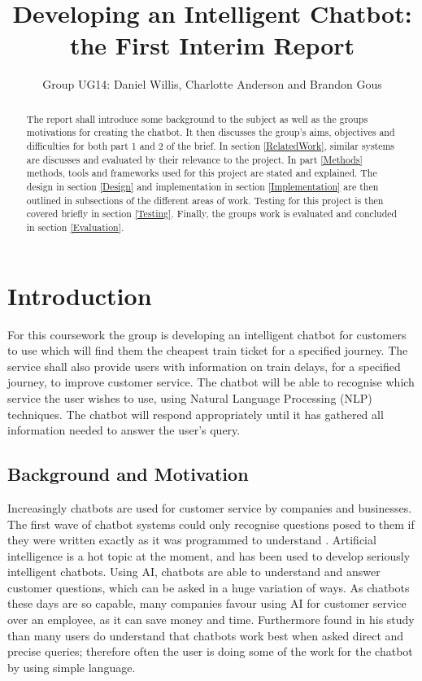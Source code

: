 \documentclass[11pt]{article}
\title{Developing an Intelligent Chatbot: the First Interim Report}
\author{Group UG14: Daniel Willis, Charlotte Anderson and Brandon Gous}
\begin{document}
	
	\maketitle	
	\begin{abstract}
		The report shall introduce some background to the subject as well as the groups motivations for creating the chatbot. It then discusses the group's aims, objectives and difficulties for both part 1 and 2 of the brief. In section \ref{RelatedWork}, similar systems are discusses and evaluated by their relevance to the project. In part \ref{Methods} methods, tools and frameworks used for this project are stated and explained. The design in section \ref{Design} and implementation in section \ref{Implementation} are then outlined in subsections of the different areas of work. Testing for this project is then covered briefly in section \ref{Testing}. Finally, the groups work is evaluated and concluded in section \ref{Evaluation}.
		
	\end{abstract}
	
	\section{Introduction}
	
	For this coursework \citep{AI2018CW} the group is developing an intelligent chatbot for customers to use which will find them the cheapest train ticket for a specified journey. The service shall also provide users with information on train delays, for a specified journey, to improve customer service. The chatbot will be able to recognise which service the user wishes to use, using Natural Language Processing (NLP) techniques. The chatbot will respond appropriately until it has gathered all information needed to answer the user's query.	
	
	\subsection{Background and Motivation}
		
	Increasingly chatbots are used for customer service by companies and businesses. The first wave of chatbot systems could only recognise questions posed to them if they were written exactly as it was programmed to understand \citet{Ebi}. Artificial intelligence is a hot topic at the moment, and has been used to develop seriously intelligent chatbots. Using AI, chatbots are able to understand and answer customer questions, which can be asked in a huge variation of ways. As chatbots these days are so capable, many companies favour using AI for customer service over an employee, as it can save money and time. Furthermore \citet{Sintef} found in his study than many users do understand that chatbots work best when asked direct and precise queries; therefore often the user is doing some of the work for the chatbot by using simple language.	
	
\end{document}
